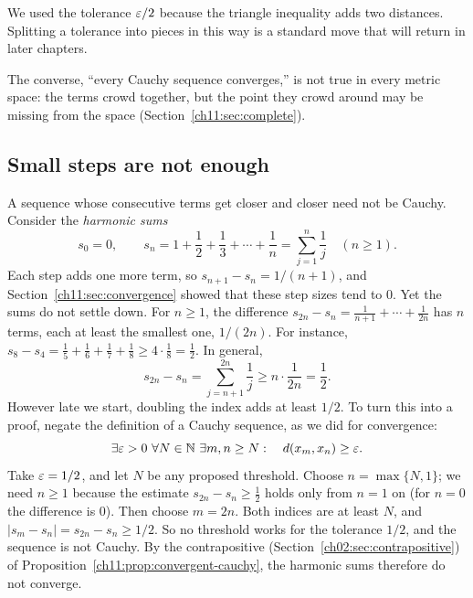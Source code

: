 We used the tolerance $\varepsilon/2$ because the triangle inequality adds two distances. Splitting a tolerance into pieces in this way is a standard move that will return in later chapters.

The converse, ``every Cauchy sequence converges,'' is not true in every metric space: the terms crowd together, but the point they crowd around may be missing from the space (Section~\ref{ch11:sec:complete}).

\subsection*{Small steps are not enough}
A sequence whose consecutive terms get closer and closer need not be Cauchy. Consider the \emph{harmonic sums}
\[
s_0=0,\qquad s_n=1+\frac12+\frac13+\cdots+\frac1n=\sum_{j=1}^n\frac1j\quad(n\ge1).
\]
Each step adds one more term, so $s_{n+1}-s_n=1/(n+1)$, and Section~\ref{ch11:sec:convergence} showed that these step sizes tend to $0$. Yet the sums do not settle down. For $n\ge1$, the difference $s_{2n}-s_n=\frac1{n+1}+\cdots+\frac1{2n}$ has $n$ terms, each at least the smallest one, $1/(2n)$. For instance, $s_8-s_4=\frac15+\frac16+\frac17+\frac18\ge4\cdot\frac18=\frac12$. In general,
\[
s_{2n}-s_n=\sum_{j=n+1}^{2n}\frac1j\ge n\cdot\frac1{2n}=\frac12.
\]
However late we start, doubling the index adds at least $1/2$. To turn this into a proof, negate the definition of a Cauchy sequence, as we did for convergence:
\[
\exists\varepsilon>0\ \forall N\in\mathbb N\ \exists m,n\ge N:\quad d(x_m,x_n)\ge\varepsilon.
\]
Take $\varepsilon=1/2$, and let $N$ be any proposed threshold. Choose $n=\max\{N,1\}$; we need $n\ge1$ because the estimate $s_{2n}-s_n\ge\tfrac12$ holds only from $n=1$ on (for $n=0$ the difference is $0$). Then choose $m=2n$. Both indices are at least $N$, and $|s_m-s_n|=s_{2n}-s_n\ge1/2$. So no threshold works for the tolerance $1/2$, and the sequence is not Cauchy. By the contrapositive (Section~\ref{ch02:sec:contrapositive}) of Proposition~\ref{ch11:prop:convergent-cauchy}, the harmonic sums therefore do not converge.
